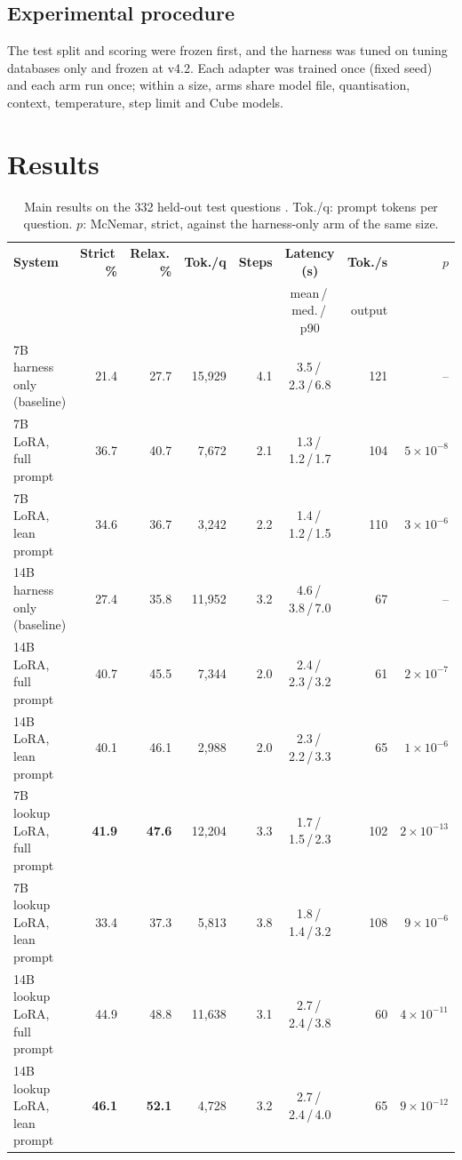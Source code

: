 \subsection{Experimental procedure}
The test split and scoring were frozen first, and the harness was tuned on tuning databases only and frozen at v4.2. Each adapter was trained once (fixed seed) and each arm run once; within a size, arms share model file, quantisation, context, temperature, step limit and Cube models.


\section{Results}

\begin{table}[!htbp]
\centering
\footnotesize
\caption{Main results on the 332 held-out test questions . Tok./q: prompt tokens per question. $p$: McNemar, strict, against the harness-only arm of the same size.}
\label{tab:main}
\setlength{\tabcolsep}{4pt}
\begin{tabularx}{\linewidth}{@{}Xrrrrcrr@{}}
\toprule
\textbf{System} & \textbf{Strict\,\%} & \textbf{Relax.\,\%} & \textbf{Tok./q} & \textbf{Steps} & \textbf{Latency (s)} & \textbf{Tok./s} & $p$\\
 & & & & & {\scriptsize mean\,/\,med.\,/\,p90} & {\scriptsize output} & \\
\midrule
7B harness only (baseline) & 21.4 & 27.7 & 15,929 & 4.1 & 3.5\,/\,2.3\,/\,6.8 & 121 & --\\
7B LoRA, full prompt & 36.7 & 40.7 & 7,672 & 2.1 & 1.3\,/\,1.2\,/\,1.7 & 104 & $5{\times}10^{-8}$\\
7B LoRA, lean prompt & 34.6 & 36.7 & 3,242 & 2.2 & 1.4\,/\,1.2\,/\,1.5 & 110 & $3{\times}10^{-6}$\\
\midrule
14B harness only (baseline) & 27.4 & 35.8 & 11,952 & 3.2 & 4.6\,/\,3.8\,/\,7.0 & 67 & --\\
14B LoRA, full prompt & 40.7 & 45.5 & 7,344 & 2.0 & 2.4\,/\,2.3\,/\,3.2 & 61 & $2{\times}10^{-7}$\\
14B LoRA, lean prompt & 40.1 & 46.1 & 2,988 & 2.0 & 2.3\,/\,2.2\,/\,3.3 & 65 & $1{\times}10^{-6}$\\
\midrule
7B lookup LoRA, full prompt & \textbf{41.9} & \textbf{47.6} & 12,204 & 3.3 & 1.7\,/\,1.5\,/\,2.3 & 102 & $2{\times}10^{-13}$\\
7B lookup LoRA, lean prompt & 33.4 & 37.3 & 5,813 & 3.8 & 1.8\,/\,1.4\,/\,3.2 & 108 & $9{\times}10^{-6}$\\
14B lookup LoRA, full prompt & 44.9 & 48.8 & 11,638 & 3.1 & 2.7\,/\,2.4\,/\,3.8 & 60 & $4{\times}10^{-11}$\\
14B lookup LoRA, lean prompt & \textbf{46.1} & \textbf{52.1} & 4,728 & 3.2 & 2.7\,/\,2.4\,/\,4.0 & 65 & $9{\times}10^{-12}$\\
\bottomrule
\end{tabularx}
\end{table}

